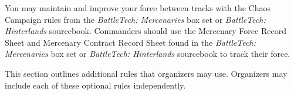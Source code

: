 You may maintain and improve your force between tracks with the Chaos Campaign rules from the \emph{BattleTech: Mercenaries} box set or \emph{BattleTech: Hinterlands} sourcebook.
Commanders should use the Mercenary Force Record Sheet and Mercenary Contract Record Sheet found in the \emph{BattleTech: Mercenaries} box set or \emph{BattleTech: Hinterlands} sourcebook to track their force.

This section outlines additional rules that organizers may use.
Organizers may include each of these optional rules independently.

